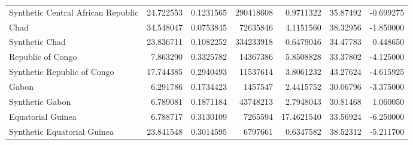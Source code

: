 \begin{table}
\begin{tabular}[t]{lrrrrrr}
Synthetic Central African Republic & 24.722553 & 0.1231565 & 290418608 & 0.9711322 & 35.87492 & -0.699275\\
Chad & 34.548047 & 0.0753845 & 72635846 & 4.1151560 & 38.32956 & -1.850000\\
Synthetic Chad & 23.836711 & 0.1082252 & 334233918 & 0.6479046 & 34.47783 & 0.448650\\
\addlinespace
Republic of Congo & 7.863290 & 0.3325782 & 14367386 & 5.8508828 & 33.37802 & -4.125000\\
Synthetic Republic of Congo & 17.744385 & 0.2940493 & 11537614 & 3.8061232 & 43.27624 & -4.615925\\
Gabon & 6.291786 & 0.1734423 & 1457547 & 2.4415752 & 30.06796 & -3.375000\\
Synthetic Gabon & 6.789081 & 0.1871184 & 43748213 & 2.7948043 & 30.81468 & 1.060050\\
Equatorial Guinea & 6.788717 & 0.3130109 & 7265594 & 17.4621540 & 33.56924 & -6.250000\\
\addlinespace
Synthetic Equatorial Guinea & 23.841548 & 0.3014595 & 6797661 & 0.6347582 & 38.52312 & -5.211700\\
\bottomrule
\end{tabular}
\end{table}